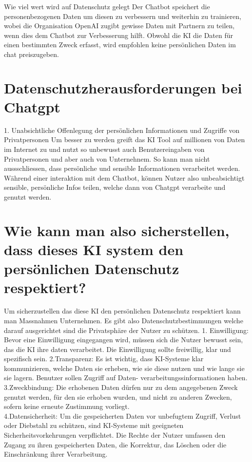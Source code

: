 \documentclass{report}
\begin{document}
    Wie viel wert wird auf Datenschutz gelegt
    Der Chatbot speichert die personenbezogenen Daten um diesen zu verbessern und weiterhin zu trainieren, wobei die Organisation OpenAI zugibt gewisse Daten mit Partnern zu teilen, wenn dies dem Chatbot zur Verbesserung hilft.
    Obwohl die KI die Daten für einen bestimmten Zweck erfasst, wird empfohlen keine persönlichen Daten im chat preiszugeben.

\section*{Datenschutzherausforderungen bei Chatgpt}
1. Unabsichtliche Offenlegung der persönlichen Informationen und Zugriffe von Privatpersonen
Um besser zu werden greift das KI Tool auf millionen von Daten im Internet zu und nutzt so unbewusst auch Benutzereingaben von Privatpersonen und aber auch von Unternehnem.
So kann man nicht aussschliessen, dass persönliche und sensible Informationen verarbeitet werden.
Während einer interaktion mit dem Chatbot, können Nutzer also unbeabsichtigt sensible, persönliche Infos teilen, welche dann von Chatgpt verarbeite und genutzt werden. 


\section{Wie kann man also sicherstellen, dass dieses KI system den persönlichen Datenschutz respektiert?}
Um sicherzustellen das diese KI den persönlichen Datenschutz respektiert kann man Massnahmen Unternehmen.
Es gibt also Datenschutzbestimmungen welche darauf ausgerichtet sind die Privatsphäre der Nutzer zu schützen. 
1. Einwilligung: Bevor eine Einwilligung eingegangen wird, müssen sich die Nutzer bewusst sein, das die KI ihre daten verarbeitet.
Die Einwilligung sollte freiwillig, klar und spezifisch sein.
2.Transparenz: Es ist wichtig, dass KI-Systeme klar kommunizieren, welche Daten sie erheben, wie sie diese nutzen und wie lange sie sie lagern. Benutzer sollen Zugriff auf Daten-
verarbeitungssinformationen haben.
3.Zweckbindung: Die erhobenen Daten dürfen nur zu dem angegebenen Zweck genutzt werden, für den sie erhoben wurden, und nicht zu anderen Zwecken, sofern keine erneute Zustimmung vorliegt.\\

4.Datensicherheit: Um die gespeicherten Daten vor unbefugtem Zugriff, Verlust oder Diebstahl zu schützen, sind KI-Systeme mit geeigneten Sicherheitsvorkehrungen verpflichtet.
Die Rechte der Nutzer umfassen den Zugang zu ihren gespeicherten Daten, die Korrektur, das Löschen oder die Einschränkung ihrer Verarbeitung.
\end{document}
